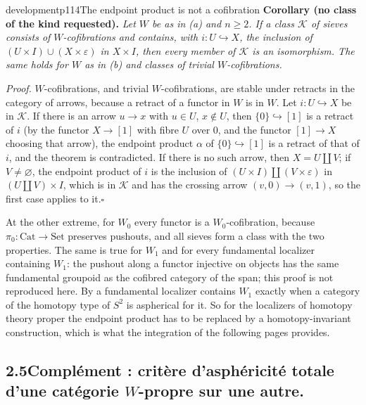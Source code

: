 \begin{dcomment}{development}{p114}{The endpoint product is not a cofibration}
\textbf{Corollary (no class of the kind requested).}\ours
\textit{Let $W$ be as in (a) and $n\geq2$. If a class $\mathcal K$ of sieves consists of $W$-cofibrations and contains, with $i:U\hookrightarrow X$, the inclusion of $(U\times I)\cup(X\times\varepsilon)$ in $X\times I$, then every member of $\mathcal K$ is an isomorphism. The same holds for $W$ as in (b) and classes of trivial $W$-cofibrations.}

\textit{Proof.}
$W$-cofibrations, and trivial $W$-cofibrations, are stable under retracts in the category of arrows, because a retract of a functor in $W$ is in $W$. Let $i:U\hookrightarrow X$ be in $\mathcal K$. If there is an arrow $u\to x$ with $u\in U$, $x\notin U$, then $\{0\}\hookrightarrow[1]$ is a retract of $i$ (by the functor $X\to[1]$ with fibre $U$ over $0$, and the functor $[1]\to X$ choosing that arrow), the endpoint product $\alpha$ of $\{0\}\hookrightarrow[1]$ is a retract of that of $i$, and the theorem is contradicted. If there is no such arrow, then $X=U\amalg V$; if $V\neq\varnothing$, the endpoint product of $i$ is the inclusion of $(U\times I)\amalg(V\times\varepsilon)$ in $(U\amalg V)\times I$, which is in $\mathcal K$ and has the crossing arrow $(v,0)\to(v,1)$, so the first case applies to it.\hfill$\square$

At the other extreme, for $W_0$ every functor is a $W_0$-cofibration, because $\pi_0:\mathrm{Cat}\to\mathrm{Set}$ preserves pushouts, and all sieves form a class with the two properties. The same is true for $W_1$ and for every fundamental localizer containing $W_1$: the pushout along a functor injective on objects has the same fundamental groupoid as the cofibred category of the span; this proof is not reproduced here. By \citet[Proposition~9.2.17]{Cisinski2006} a fundamental localizer contains $W_1$ exactly when a category of the homotopy type of $S^2$ is aspherical for it. So for the localizers of homotopy theory proper the endpoint product has to be replaced by a homotopy-invariant construction, which is what the integration of the following pages provides.
\end{dcomment}


\subsection*{2.5\quad Complément : critère d'asphéricité totale d'une catégorie $W$-propre sur une autre.}

